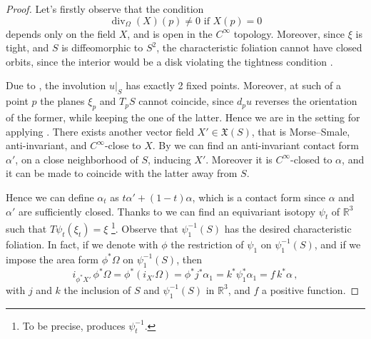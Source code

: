 \documentclass[a4paper, 11pt]{amsart}
\theoremstyle{plain}
\theoremstyle{definition}
\newcommand{\R}{\mathbb{R}}
\newcommand{\XX}{\mathfrak{X}}
\DeclareMathOperator{\diver}{div}
\begin{document}
\begin{proof}
	Let's firstly observe that the condition
	\[
		\diver_{\Omega}(X)(p) \neq 0 \text{ if } X(p) = 0
	\]
	depends only on the field $X$, and is open in the $C^\infty$ topology. Moreover, since $\xi$ is tight, and $S$ is diffeomorphic to $S^2$, the characteristic foliation cannot have closed orbits, since the interior would be a disk violating the tightness condition \cite[Prop.\ 4.6.28]{geigesIntroductionContactTopology2008}.
	
	Due to , the involution $u|_S$ has exactly 2 fixed points. Moreover, at such of a point $p$ the planes $\xi_p$ and $T_pS$ cannot coincide, since $d_pu$ reverses the orientation of the former, while keeping the one of the latter. Hence we are in the setting for applying . There exists another vector field $X' \in \XX(S)$, that is Morse--Smale, anti-invariant, and $C^\infty$-close to $X$. By  we can find an anti-invariant contact form $\alpha'$, on a close neighborhood of $S$, inducing $X'$. Moreover it is $C^\infty$-closed to $\alpha$, and it can be made to coincide with the latter away from $S$.
		
	Hence we can define $\alpha_t$ as $t\alpha' + (1-t)\alpha$, which is a contact form since $\alpha$ and $\alpha'$ are sufficiently closed. Thanks to  we can find an equivariant isotopy $\psi_t$ of $\R^3$ such that $T\psi_t(\xi_t) = \xi$ \footnote{To be precise,  produces $\psi_t^{-1}$.}. Observe that $\psi_1^{-1}(S)$ has the desired characteristic foliation. In fact, if we denote with $\phi$ the restriction of $\psi_1$ on $\psi_1^{-1}(S)$, and if we impose the area form $\phi^*\Omega$ on $\psi_1^{-1}(S)$, then 
	\[
		i_{\phi^*X'}\, \phi^*\Omega = \phi^*(i_{X'}\Omega) = \phi^*j^*\alpha_1 = k^*\psi_1^*\alpha_1 = f\,k^*\alpha\,,
	\]
	with $j$ and $k$ the inclusion of $S$ and $\psi^{-1}_1(S)$ in $\R^3$, and $f$ a positive function.
\end{proof}
\end{document}
